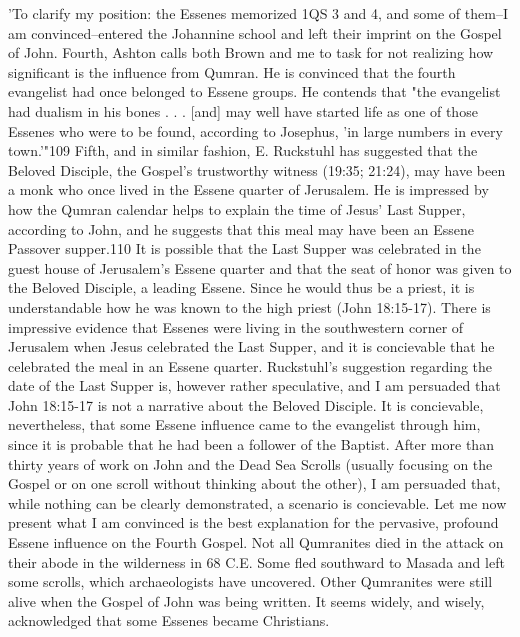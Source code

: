 \documentclass[11pt]{article}
\begin{document}
\begin{thebibliography}{37}
'To clarify my position: the Essenes memorized 1QS 3 and 4, and some of them--I am convinced--entered the Johannine school and left their imprint on the Gospel of John.
Fourth, Ashton calls both Brown and me to task for not realizing how significant is the influence from Qumran. He is convinced that the fourth evangelist had once belonged to Essene groups. He contends that "the evangelist had dualism in his bones . . . [and] may well have started life as one of those Essenes who were to be found, according to Josephus, 'in large numbers in every town.'"109 
Fifth, and in similar fashion, E. Ruckstuhl has suggested that the Beloved Disciple, the Gospel's trustworthy witness (19:35; 21:24), may have been a monk who once lived in the Essene quarter of Jerusalem. He is impressed by how the Qumran calendar helps to explain the time of Jesus' Last Supper, according to John, and he suggests that this meal may have been an Essene Passover supper.110 It is possible that the Last Supper was celebrated in the guest house of Jerusalem's Essene quarter and that the seat of honor was given to the Beloved Disciple, a leading Essene. Since he would thus be a priest, it is understandable how he was known to the high priest (John 18:15-17). There is impressive evidence that Essenes were living in the southwestern corner of Jerusalem when Jesus celebrated the Last Supper, and it is concievable that he celebrated the meal in an Essene quarter. Ruckstuhl's suggestion regarding the date of the Last Supper is, however rather speculative, and I am persuaded that John 18:15-17 is not a narrative about the Beloved Disciple. It is concievable, nevertheless, that some Essene influence came to the evangelist through him, since it is probable that he had been a follower of the Baptist.
After more than thirty years of work on John and the Dead Sea Scrolls (usually focusing on the Gospel or on one scroll without thinking about the other), I am persuaded that, while nothing can be clearly demonstrated, a scenario is concievable. Let me now present what I am convinced is the best explanation for the pervasive, profound Essene influence on the Fourth Gospel. 
Not all Qumranites died in the attack on their abode in the wilderness in 68 C.E.
Some fled southward to Masada and left some scrolls, which archaeologists have uncovered. Other Qumranites were still alive when the Gospel of John was being written. It seems widely, and wisely, acknowledged that some Essenes became Christians.

\end{thebibliography}
\end{document}
